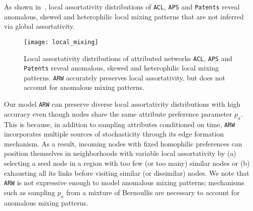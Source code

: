 As shown in~, local assortativity distributions
of \texttt{ACL}, \texttt{APS} and \texttt{Patents} reveal anomalous, skewed
and heterophilic local mixing patterns that are not inferred via global assortativity.
\begin{figure}[h]
	\centering
	\vspace{-9pt}
	\texttt{[image: local\_mixing]}
	\caption{Local assortativity distributions of attributed networks \texttt{ACL}, \texttt{APS}
		and \texttt{Patents} reveal anomalous, skewed and heterophilic local mixing patterns.
		\texttt{ARW} accurately preserves local assortativity, but does not account for anomalous mixing patterns.}
	\label{fig:local_atty}
	\vspace{-8pt}
\end{figure}
Our model \texttt{ARW} can preserve
diverse local assortativity distributions with high accuracy even though nodes
share the same attribute preference parameter $p_a$. This is because, in addition
to sampling attributes conditioned on time, \texttt{ARW}
incorporates multiple sources of stochasticity through its edge formation
mechanism. As a result, incoming nodes with fixed homophilic preferences can position
themselves in neighborhoods with variable local assortativity by (a) selecting a seed node in a region
with too few (or too many) similar nodes or (b) exhausting all its links before
visiting similar (or dissimilar) nodes.
We note that \texttt{ARW} is not expressive enough to model anomalous
mixing patterns; mechanisms such as sampling $p_a$ from a mixture of
Bernoullis are necessary to account for anomalous mixing patterns.

